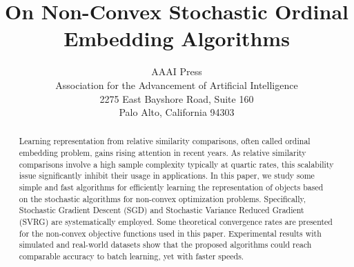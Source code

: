 \documentclass[letterpaper]{article}
\newcommand{\qqxu}[1]{\textcolor[rgb]{0.00,1.00,0.00}{#1}}
\begin{document}
		\title{On Non-Convex Stochastic Ordinal Embedding Algorithms}
		\author
		{
			AAAI Press\\
			Association for the Advancement of Artificial Intelligence\\
			2275 East Bayshore Road, Suite 160\\
			Palo Alto, California 94303\\
		}

		\maketitle
		\begin{abstract}
			Learning representation from relative similarity comparisons, often called ordinal embedding problem, gains rising attention in recent years. As relative similarity comparisons involve a high sample complexity typically at quartic rates, this scalability issue significantly inhibit their usage in applications. In this paper, we study some simple and fast algorithms for efficiently learning the representation of objects based on the stochastic algorithms for non-convex optimization problems. Specifically, Stochastic Gradient Descent (SGD) and Stochastic Variance Reduced Gradient (SVRG) are systematically employed. Some theoretical convergence rates are presented for the non-convex objective functions used in this paper. Experimental results with simulated and real-world datasets show that the proposed algorithms could reach comparable accuracy to batch learning, yet with faster speeds.

		\end{abstract}
%
%
\end{document}
